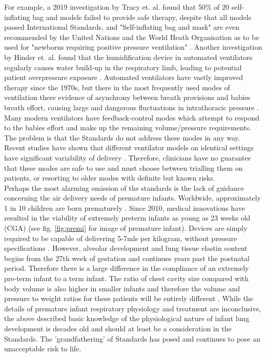 \documentclass[12pt, openany, oneside]{book}
\begin{document}
\newpage

For example, a 2019 investigation by Tracy et. al. found that 50{\%} of 20 self-inflating bag and models failed to provide safe therapy, \citep{tracy2019newborn} despite that all models passed International Standards, and "Self-inflating bag and mask" are even recommended by the United Nations and the World Heath Organisation as to be used for "newborns requiring positive pressure ventilation" \citep{muzza, UN, who}. Another investigation by Hinder et. al. found that the humidification device in automated ventilators regularly causes water build-up in the respiratory limb, leading to potential patient overpressure exposure \citep{hinder2016}. Automated ventilators have vastly improved therapy since the 1970s, but there in the most frequently used modes of ventilation there evidence of asynchrony between breath provisions and babies breath effort, causing large and dangerous fluctuations in intrathoracic pressure \cite{evidence}. Many modern ventilators have feedback-control modes which attempt to respond to the babies effort and make up the remaining volume/pressure requirements. The problem is that the Standards do not address these modes in any way. Recent studies have shown that different ventilator models on identical settings have significant variability of delivery \citep{krieger2017volume, itagaki2017effects}. Therefore, clinicians have no guarantee that these modes are safe to use and must choose between trialling them on patients, or resorting to older modes with definite but known risks.  \\


Perhaps the most alarming omission of the standards is the lack of guidance concerning the air delivery needs of premature infants. Worldwide, approximately 1 in 10 children are born prematurely . Since 2010, medical innovations have resulted in the viability of extremely preterm infants as young as 23 weeks old (CGA) \citep{glass2015outcomes} (see fig. \ref{fig:premi} for image of premature infant). Devices are simply required to be capable of delivering 5-7mls per kilogram, without pressure specifications \citep{tga}. However, alveolar development and lung tissue elastin content begins from the 27th week of gestation and continues years past the postnatal period. Therefore there is a large difference in the compliance of an extremely pre-term infant to a term infant. The ratio of chest cavity size compared with body volume is also higher in smaller infants and therefore the volume and pressure to weight ratios for these patients will be entirely different \citep{burri1984fetal}. While the details of premature infant respiratory physiology and treatment are inconclusive, the above described basic knowledge of the physiological nature of infant lung development is decades old and should at least be a consideration in the Standards.  The 'grandfathering' of Standards has posed and continues to pose an unacceptable risk to life.\\
\end{document}
